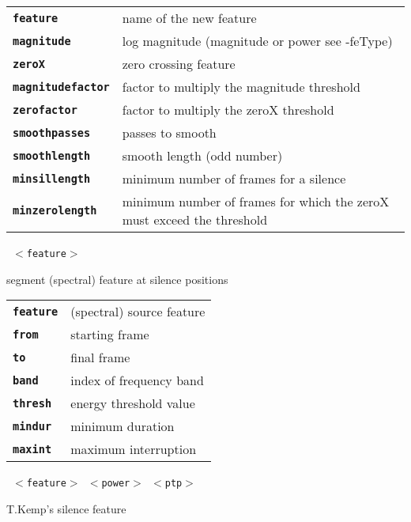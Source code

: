 \begin{description}
\begin{description}
      \begin{tabular}{ll}
 \texttt{\textbf{feature}} &         name of the new feature \\
 \texttt{\textbf{magnitude}} &       log magnitude (magnitude or power see -feType) \\
 \texttt{\textbf{zeroX}} &           zero crossing feature \\
 \texttt{\textbf{magnitudefactor}} &  factor to multiply the magnitude threshold  \\
 \texttt{\textbf{zerofactor}} &       factor to multiply the zeroX threshold  \\
 \texttt{\textbf{smoothpasses}} &     passes to smooth  \\
 \texttt{\textbf{smoothlength}} &     smooth length (odd number)  \\
 \texttt{\textbf{minsillength}} &     minimum number of frames for a silence  \\
 \texttt{\textbf{minzerolength}} &    minimum number of frames for which the zeroX must exceed the threshold  \\
      \end{tabular}
       \texttt{ $<$feature$>$      } \

        segment (spectral) feature at silence positions

      \begin{tabular}{ll}
 \texttt{\textbf{feature}} &  (spectral) source feature \\
 \texttt{\textbf{from}} &      starting frame  \\
 \texttt{\textbf{to}} &        final frame  \\
 \texttt{\textbf{band}} &      index of frequency band  \\
 \texttt{\textbf{thresh}} &    energy threshold value  \\
 \texttt{\textbf{mindur}} &    minimum duration  \\
 \texttt{\textbf{maxint}} &    maximum interruption  \\
      \end{tabular}
       \texttt{ $<$feature$>$ $<$power$>$ $<$ptp$>$  } \

        T.Kemp's silence feature


\end{description}
\end{description}
